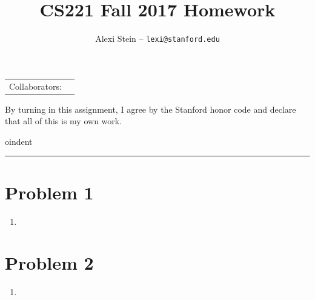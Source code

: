 \documentclass[12pt]{article}
\title{CS221 Fall 2017 Homework }
\author{Alexi Stein -- \texttt{lexi@stanford.edu}}
\begin{document}
  \maketitle
  \begin{center}

  \vspace{-0.3in}
  \begin{tabular}{rl}
  Collaborators: & 
  \end{tabular}
  \end{center}

  By turning in this assignment, I agree by the Stanford honor code and declare
  that all of this is my own work.

  
oindent
  \rule{\linewidth}{0.4pt}
  
  \section*{Problem 1}

  \begin{enumerate}[label=(\alph*)]
    \item 
  \end{enumerate}

  \section*{Problem 2}

  \begin{enumerate}[label=(\alph*)]
    \item 
  \end{enumerate}
\end{document}
